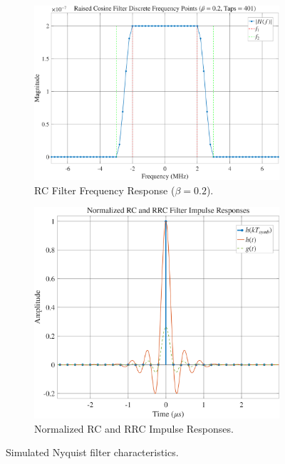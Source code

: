 \documentclass[11pt]{article}
\begin{document}
	\begin{figure}[H]
		\centering
		\begin{subfigure}[t]{0.53\textwidth}
			\centering
			\includegraphics[width=\linewidth]{Images/h-rc-freq}
			\caption{RC Filter Frequency Response ($\beta = 0.2$).}
			\label{fig:h-rc-freq_compact}
		\end{subfigure}
		\hfill
		\begin{subfigure}[t]{0.46\textwidth}
			\centering
			\includegraphics[width=\linewidth]{Images/h-rc}
			\caption{Normalized RC and RRC Impulse Responses.}
			\label{fig:h-rc_compact}
		\end{subfigure}
		\caption{Simulated Nyquist filter characteristics.}
		\label{fig:nyquist-filter-combined}
	\end{figure}
	
\end{document}
